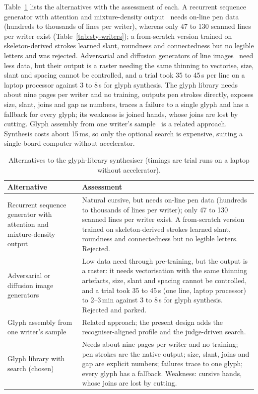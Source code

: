 Table~\ref{tab:syn-alt} lists the alternatives with the assessment of each.
A recurrent sequence generator with attention and mixture-density output~\cite{graves2013} needs on-line pen data (hundreds to thousands of lines per writer), whereas only 47 to 130 scanned lines per writer exist (Table~\ref{tab:sty-writers}); a from-scratch version trained on skeleton-derived strokes learned slant, roundness and connectedness but no legible letters and was rejected.
Adversarial and diffusion generators of line images~\cite{kang2020,dai2024} need less data, but their output is a raster needing the same thinning to vectorise, size, slant and spacing cannot be controlled, and a trial took 35 to 45\,s per line on a laptop processor against 3 to 8\,s for glyph synthesis.
The glyph library needs about nine pages per writer and no training, outputs pen strokes directly, exposes size, slant, joins and gap as numbers, traces a failure to a single glyph and has a fallback for every glyph; its weakness is joined hands, whose joins are lost by cutting.
Glyph assembly from one writer's sample~\cite{haines2016} is a related approach.
Synthesis costs about 15\,ms, so only the optional search is expensive, suiting a single-board computer without accelerator.

\begin{table}[!htbp]
\centering
\fontsize{9.5}{11.5}\selectfont
\begin{tabularx}{\linewidth}{|p{3.2cm}|X|}
\hline
\textbf{Alternative} & \textbf{Assessment} \\
\hline
Recurrent sequence generator with attention and mixture-density output~\cite{graves2013} & Natural cursive, but needs on-line pen data (hundreds to thousands of lines per writer); only 47 to 130 scanned lines per writer exist. A from-scratch version trained on skeleton-derived strokes learned slant, roundness and connectedness but no legible letters. Rejected. \\
\hline
Adversarial or diffusion image generators~\cite{kang2020,dai2024} & Low data need through pre-training, but the output is a raster: it needs vectorisation with the same thinning artefacts, size, slant and spacing cannot be controlled, and a trial took 35 to 45\,s (one line, laptop processor) to 2--3\,min against 3 to 8\,s for glyph synthesis. Rejected and parked. \\
\hline
Glyph assembly from one writer's sample~\cite{haines2016} & Related approach; the present design adds the recogniser-aligned profile and the judge-driven search. \\
\hline
Glyph library with search (chosen) & Needs about nine pages per writer and no training; pen strokes are the native output; size, slant, joins and gap are explicit numbers; failures trace to one glyph; every glyph has a fallback. Weakness: cursive hands, whose joins are lost by cutting. \\
\hline
\end{tabularx}
\caption{Alternatives to the glyph-library synthesiser (timings are trial runs on a laptop without accelerator).}
\label{tab:syn-alt}
\end{table}
